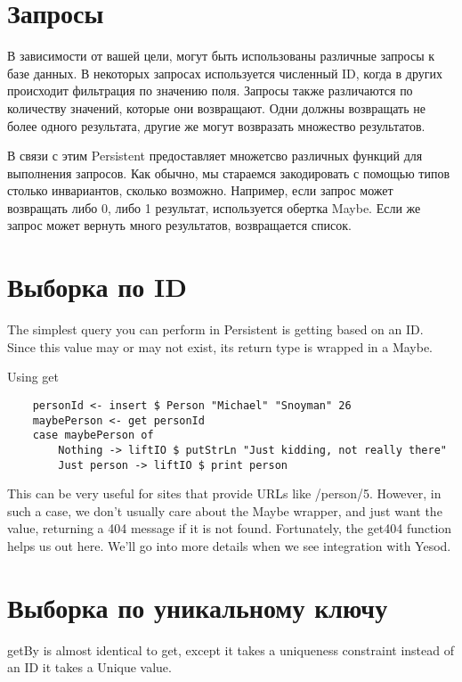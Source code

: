 \section{Запросы} %

В зависимости от вашей цели, могут быть использованы различные запросы к базе данных. В некоторых запросах используется численный ID, когда в других происходит фильтрация по значению поля. Запросы также различаются по количеству значений, которые они возвращают. Одни должны возвращать не более одного результата, другие же могут возвразать множество результатов.

В связи с этим Persistent предоставляет множетсво различных функций для выполнения запросов. Как обычно, мы стараемся закодировать с помощью типов столько инвариантов, сколько возможно. Например, если запрос может возвращать либо 0, либо 1 результат, используется обертка Maybe. Если же запрос может вернуть много результатов, возвращается список.

\section{Выборка по ID} %

The simplest query you can perform in Persistent is getting based on an ID. Since this value may or may not exist, its return type is wrapped in a Maybe.

Using get %

\begin{lstlisting}
    personId <- insert $ Person "Michael" "Snoyman" 26
    maybePerson <- get personId
    case maybePerson of
        Nothing -> liftIO $ putStrLn "Just kidding, not really there"
        Just person -> liftIO $ print person
\end{lstlisting}%

This can be very useful for sites that provide URLs like /person/5. However, in such a case, we don't usually care about the Maybe wrapper, and just want the value, returning a 404 message if it is not found. Fortunately, the get404 function helps us out here. We'll go into more details when we see integration with Yesod.

\section{Выборка по уникальному ключу} %

getBy is almost identical to get, except it takes a uniqueness constraint instead of an ID it takes a Unique value.


